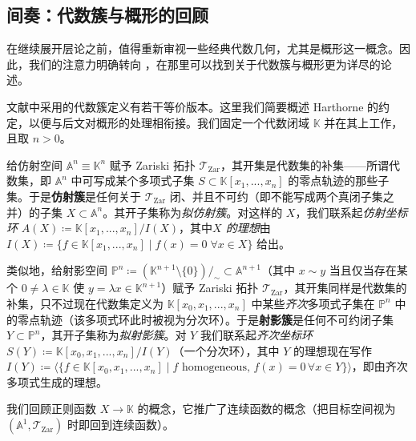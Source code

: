 \subsection{间奏：代数簇与概形的回顾}\label{ch5.5}


在继续展开层论之前，值得重新审视一些经典代数几何，尤其是概形这一概念。因此，我们的注意力明确转向 \cite[第 I–II 章]{[Har77]}，在那里可以找到关于代数簇与概形更为详尽的论述。

\begin{Rem}\label{aboutvarieties}
文献中采用的代数簇定义有若干等价版本。这里我们简要概述 Harthorne 的约定，以便与后文对概形的处理相衔接。我们固定一个代数闭域 $\mathbb{K}$ 并在其上工作，且取 $n>0$。

给仿射空间 $\mathbb{A}^n\equiv\mathbb{K}^n$ 赋予 Zariski 拓扑 $\mathcal{T}_\text{Zar}$，其开集是代数集的补集——所谓代数集，即 $\mathbb{A}^n$ 中可写成某个多项式子集 $S\subset \mathbb{K}[x_1,...,x_n]$ 的零点轨迹的那些子集。于是\textbf{仿射簇}是任何关于 $\mathcal{T}_\text{Zar}$ 闭、并且不可约（即不能写成两个真闭子集之并）的子集 $X\subset\mathbb{A}^n$。其开子集称为\textit{拟仿射簇}。对这样的 $X$，我们联系起\textit{仿射坐标环} $A(X)\coloneqq \mathbb{K}[x_1,...,x_n]/I(X)$，其中\textit{$X$ 的理想}由 $I(X)\coloneqq \{f\in\mathbb{K}[x_1,...,x_n]\mid f(x)=0\;\forall x\in X\}$ 给出。

类似地，给射影空间 $\mathbb{P}^n\coloneqq(\mathbb{K}^{n+1}\setminus\{0\})/_\sim\subset\mathbb{A}^{n+1}$（其中 $x\sim y$ 当且仅当存在某个 $0\neq \lambda\in\mathbb{K}$ 使 $y=\lambda x\in\mathbb{K}^{n+1}$）赋予 Zariski 拓扑 $\mathcal{T}_\text{Zar}$，其开集同样是代数集的补集，只不过现在代数集定义为 $\mathbb{K}[x_0,x_1,...,x_n]$ 中某些\textit{齐次}多项式子集在 $\mathbb{P}^n$ 中的零点轨迹（该多项式环此时被视为分次环）。于是\textbf{射影簇}是任何不可约闭子集 $Y\subset\mathbb{P}^n$，其开子集称为\textit{拟射影簇}。对 $Y$ 我们联系起\textit{齐次坐标环} $S(Y)\coloneqq \mathbb{K}[x_0,x_1,...,x_n]/I(Y)$（一个分次环），其中 $Y$ 的理想现在写作 $I(Y)\coloneqq\langle\{f\in\mathbb{K}[x_0,x_1,...,x_n]\mid f\text{ homogeneous},\, f(x)=0\,\forall x\in Y\}\rangle$，即由齐次多项式生成的理想。  
\end{Rem} 

我们回顾正则函数 $X\rightarrow\mathbb{K}$ 的概念，它推广了连续函数的概念（把目标空间视为 $(\mathbb{A}^1,\mathcal{T}_\text{Zar})$ 时即回到连续函数）。

